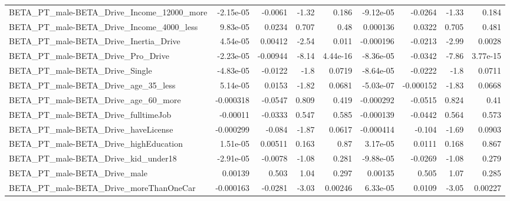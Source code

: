 \begin{tabular}{lrrrrrrrr}
BETA\_PT\_male-BETA\_Drive\_Income\_12000\_more          &   -2.15e-05 &      -0.0061 &    -1.32 &    0.186 &  -9.12e-05 &     -0.0264 &        -1.33 &         0.184 \\
BETA\_PT\_male-BETA\_Drive\_Income\_4000\_less           &    9.83e-05 &       0.0234 &    0.707 &     0.48 &   0.000136 &      0.0322 &        0.705 &         0.481 \\
BETA\_PT\_male-BETA\_Drive\_Inertia\_Drive              &    4.54e-05 &      0.00412 &    -2.54 &    0.011 &  -0.000196 &     -0.0213 &        -2.99 &        0.0028 \\
BETA\_PT\_male-BETA\_Drive\_Pro\_Drive                  &   -2.23e-05 &     -0.00944 &    -8.14 & 4.44e-16 &  -8.36e-05 &     -0.0342 &        -7.86 &      3.77e-15 \\
BETA\_PT\_male-BETA\_Drive\_Single                     &   -4.83e-05 &      -0.0122 &     -1.8 &   0.0719 &  -8.64e-05 &     -0.0222 &         -1.8 &        0.0711 \\
BETA\_PT\_male-BETA\_Drive\_age\_35\_less                &    5.14e-05 &       0.0153 &    -1.82 &   0.0681 &  -5.03e-07 &   -0.000152 &        -1.83 &        0.0668 \\
BETA\_PT\_male-BETA\_Drive\_age\_60\_more                &   -0.000318 &      -0.0547 &    0.809 &    0.419 &  -0.000292 &     -0.0515 &        0.824 &          0.41 \\
BETA\_PT\_male-BETA\_Drive\_fulltimeJob                &    -0.00011 &      -0.0333 &    0.547 &    0.585 &  -0.000139 &     -0.0442 &        0.564 &         0.573 \\
BETA\_PT\_male-BETA\_Drive\_haveLicense                &   -0.000299 &       -0.084 &    -1.87 &   0.0617 &  -0.000414 &      -0.104 &        -1.69 &        0.0903 \\
BETA\_PT\_male-BETA\_Drive\_highEducation              &    1.51e-05 &      0.00511 &    0.163 &     0.87 &   3.17e-05 &      0.0111 &        0.168 &         0.867 \\
BETA\_PT\_male-BETA\_Drive\_kid\_under18                &   -2.91e-05 &      -0.0078 &    -1.08 &    0.281 &  -9.88e-05 &     -0.0269 &        -1.08 &         0.279 \\
BETA\_PT\_male-BETA\_Drive\_male                       &     0.00139 &        0.503 &     1.04 &    0.297 &    0.00135 &       0.505 &         1.07 &         0.285 \\
BETA\_PT\_male-BETA\_Drive\_moreThanOneCar             &   -0.000163 &      -0.0281 &    -3.03 &  0.00246 &   6.33e-05 &      0.0109 &        -3.05 &       0.00227 \\

\end{tabular}
